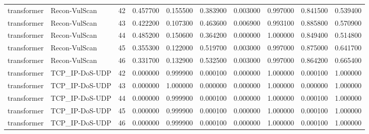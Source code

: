 \begin{table}
\begin{tabular}{llrrrrrrrr}
transformer & Recon-VulScan & 42 & 0.457700 & 0.155500 & 0.383900 & 0.003000 & 0.997000 & 0.841500 & 0.539400 \\
transformer & Recon-VulScan & 43 & 0.422200 & 0.107300 & 0.463600 & 0.006900 & 0.993100 & 0.885800 & 0.570900 \\
transformer & Recon-VulScan & 44 & 0.485200 & 0.150600 & 0.364200 & 0.000000 & 1.000000 & 0.849400 & 0.514800 \\
transformer & Recon-VulScan & 45 & 0.355300 & 0.122000 & 0.519700 & 0.003000 & 0.997000 & 0.875000 & 0.641700 \\
transformer & Recon-VulScan & 46 & 0.331700 & 0.132900 & 0.532500 & 0.003000 & 0.997000 & 0.864200 & 0.665400 \\
transformer & TCP\_IP-DoS-UDP & 42 & 0.000000 & 0.999900 & 0.000100 & 0.000000 & 1.000000 & 0.000100 & 1.000000 \\
transformer & TCP\_IP-DoS-UDP & 43 & 0.000000 & 1.000000 & 0.000000 & 0.000000 & 1.000000 & 0.000000 & 1.000000 \\
transformer & TCP\_IP-DoS-UDP & 44 & 0.000000 & 0.999900 & 0.000100 & 0.000000 & 1.000000 & 0.000100 & 1.000000 \\
transformer & TCP\_IP-DoS-UDP & 45 & 0.000000 & 0.999900 & 0.000100 & 0.000000 & 1.000000 & 0.000100 & 1.000000 \\
transformer & TCP\_IP-DoS-UDP & 46 & 0.000000 & 0.999900 & 0.000100 & 0.000000 & 1.000000 & 0.000100 & 1.000000 \\
\bottomrule
\end{tabular}
\end{table}
